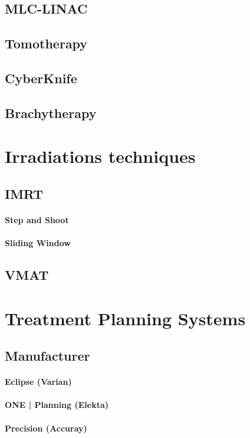 \subsection{MLC-LINAC}
\subsection{Tomotherapy}
\subsection{CyberKnife}
\subsection{Brachytherapy}

\section{Irradiations techniques}
\subsection{IMRT}
\paragraph{Step and Shoot}
\paragraph{Sliding Window}
\subsection{VMAT}

\section{Treatment Planning Systems}
\subsection{Manufacturer}
\paragraph{Eclipse (Varian)}
\paragraph{ONE | Planning (Elekta)}
\paragraph{Precision (Accuray)}
